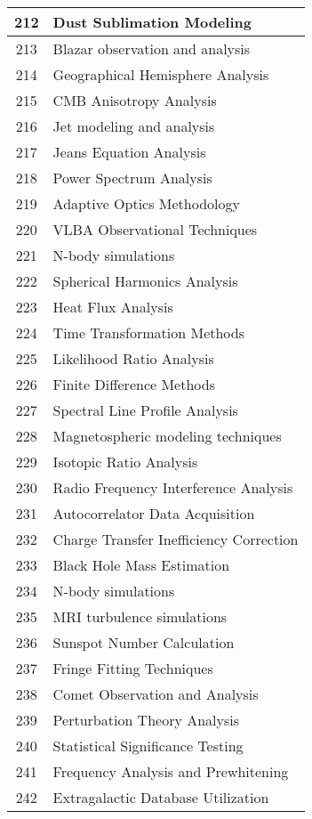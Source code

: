 \begin{table}[htbp]
\begin{tabular}{|c|l|}
\hline
212 & Dust Sublimation Modeling \\
\hline
213 & Blazar observation and analysis \\
\hline
214 & Geographical Hemisphere Analysis \\
\hline
215 & CMB Anisotropy Analysis \\
\hline
216 & Jet modeling and analysis \\
\hline
217 & Jeans Equation Analysis \\
\hline
218 & Power Spectrum Analysis \\
\hline
219 & Adaptive Optics Methodology \\
\hline
220 & VLBA Observational Techniques \\
\hline
221 & N-body simulations \\
\hline
222 & Spherical Harmonics Analysis \\
\hline
223 & Heat Flux Analysis \\
\hline
224 & Time Transformation Methods \\
\hline
225 & Likelihood Ratio Analysis \\
\hline
226 & Finite Difference Methods \\
\hline
227 & Spectral Line Profile Analysis \\
\hline
228 & Magnetospheric modeling techniques \\
\hline
229 & Isotopic Ratio Analysis \\
\hline
230 & Radio Frequency Interference Analysis \\
\hline
231 & Autocorrelator Data Acquisition \\
\hline
232 & Charge Transfer Inefficiency Correction \\
\hline
233 & Black Hole Mass Estimation \\
\hline
234 & N-body simulations \\
\hline
235 & MRI turbulence simulations \\
\hline
236 & Sunspot Number Calculation \\
\hline
237 & Fringe Fitting Techniques \\
\hline
238 & Comet Observation and Analysis \\
\hline
239 & Perturbation Theory Analysis \\
\hline
240 & Statistical Significance Testing \\
\hline
241 & Frequency Analysis and Prewhitening \\
\hline
242 & Extragalactic Database Utilization \\

\end{tabular}
\end{table}
